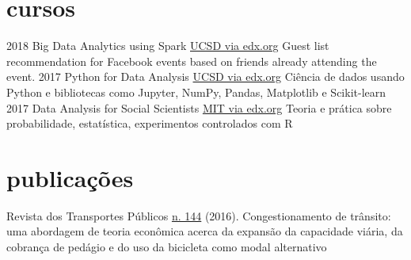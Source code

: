 \documentclass[]{friggeri-cv}
\begin{document}
\section{cursos}

\begin{entrylist}
  \entry
    {2018}
    {Big Data Analytics using Spark}
    {\href{https://www.edx.org/course/big-data-analytics-using-spark-uc-san-diego-dse230x}{UCSD via edx.org}}
    {Guest list recommendation for Facebook events based on friends already attending the event.}
  \entry
    {2017}
    {Python for Data Analysis}
    {\href{https://www.edx.org/course/python-data-science-uc-san-diego-dse200x}{UCSD via edx.org}}
    {Ciência de dados usando Python e bibliotecas como Jupyter, NumPy, Pandas, Matplotlib e Scikit-learn}
  \entry
    {2017}
    {Data Analysis for Social Scientists}
    {\href{https://www.edx.org/course/data-analysis-social-scientists-mitx-14-310x-2}{MIT via edx.org}}
    {Teoria e prática sobre probabilidade, estatística, experimentos controlados com R}
\end{entrylist}

\section{publicações}

Revista dos Transportes Públicos \href{http://files.antp.org.br/2016/12/21/rtp-144-e\_1.pdf}{n. 144} (2016). Congestionamento de trânsito: uma abordagem de teoria econômica acerca da expansão da capacidade viária, da cobrança de pedágio e do uso da bicicleta como modal alternativo

% 
\end{document}
